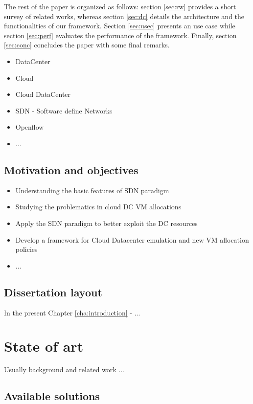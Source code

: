 \documentclass[12pt,english]{book}
\begin{document}
The rest of the paper is organized as follows: section \ref{sec:rw} provides a short survey of related works, whereas section \ref{sec:dc} details the architecture and the functionalities of our framework. Section \ref{sec:usec} presents an use case while section \ref{sec:perf} evaluates the performance of the framework. Finally, section \ref{sec:conc} concludes the paper with some final remarks.

\begin{itemize}
	\item DataCenter
	\item Cloud
	\item Cloud DataCenter
	\item SDN - Software define Networks
	\item Openflow
	\item ...
\end{itemize}

\section{Motivation and objectives\label{sec:motobj}}

\begin{itemize}
	\item Understanding the basic features of SDN paradigm
	\item Studying the problematics in cloud DC VM allocations
	\item Apply the SDN paradigm to better exploit the DC resources
	\item Develop a framework for Cloud Datacenter emulation and new VM allocation policies
	\item ...
\end{itemize}

\section{Dissertation layout}

In the present Chapter \ref{cha:introduction} - ...

\chapter{State of art \label{cha:stateofart} }

Usually background and related work ...

\section{Available solutions}
\end{document}
